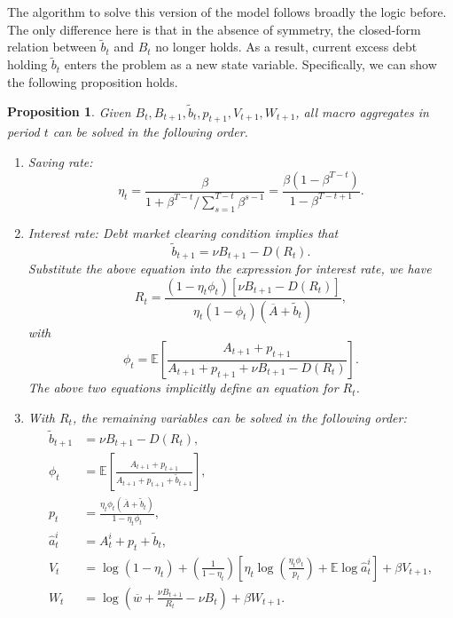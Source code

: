 \documentclass[twoside,11pt,leqno]{article}
\newcommand{\E}{\mathbb{E}}
\newtheorem{proposition}{Proposition}
\begin{document}
The algorithm to solve this version of the model follows broadly the logic before. The only difference here is that in the absence of symmetry, the closed-form relation between $\tilde{b}_t$ and $B_t$ no longer holds. As a result, current excess debt holding $\tilde{b}_t$ enters the problem as a new state variable. Specifically, we can show the following proposition holds.
\begin{proposition}
\label{prop:algorithm}
Given $B_{t}, B_{t+1}, \tilde{b}_t, p_{t+1}, V_{t+1}, W_{t+1}$, all macro aggregates in period $t$ can be solved in the following order.
\begin{enumerate}
    \item
    Saving rate:
    \begin{equation*}
        \eta_t = \frac{\beta}{1+\beta^{T-t}/\sum_{s=1}^{T-t}\beta^{s-1}} = \frac{\beta(1-\beta^{T-t})}{1-\beta^{T-t+1}}.
    \end{equation*}
    \item
    Interest rate: Debt market clearing condition implies that
    \begin{equation*}
        \tilde{b}_{t+1} = \nu B_{t+1} - D(R_t).
    \end{equation*}
    Substitute the above equation into the expression for interest rate, we have
    \begin{equation*}
        R_t = \frac{(1-\eta_t \phi_t)[\nu B_{t+1}-D(R_t)]}{\eta_t (1-\phi_t)(\overline{A}+\tilde{b}_t)},
    \end{equation*}
    with
    \begin{equation*}
        \phi_t = \E \left[\frac{A_{t+1} + p_{t+1}}{A_{t+1} + p_{t+1} + \nu B_{t+1} - D(R_t)} \right].
    \end{equation*}
    The above two equations implicitly define an equation for $R_t$.
    \item
    With $R_t$, the remaining variables can be solved in the following order:
    \begin{align*}
        \tilde{b}_{t+1} &= \nu B_{t+1} - D(R_t), \\
        \phi_{t} &= \E\left[\frac{A_{t+1}+p_{t+1}}{A_{t+1}+p_{t+1}+\tilde{b}_{t+1}} \right], \\
        p_{t} &= \frac{\eta_t \phi_{t}(\overline{A}+\tilde{b}_{t})}{1-\eta_t \phi_{t}}, \\
        \hat{a}^i_{t} &= A^i_{t}+p_{t}+\tilde{b}_{t}, \\
        V_{t} &= \log(1-\eta_t) + \left(\frac{1}{1-\eta_t}\right)\left[\eta_t\log\left(\frac{\eta_t\phi_{t}}{p_{t}} \right)+\E\log \hat{a}^i_{t} \right]+\beta V_{t+1}, \\
        W_{t} &= \log\left(\overline{w}+\frac{\nu B_{t+1}}{R_{t}}-\nu B_{t} \right) + \beta W_{t+1}.
    \end{align*}
\end{enumerate}
\end{proposition}
\end{document}
